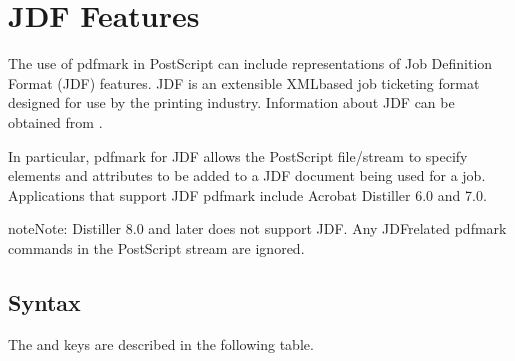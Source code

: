 \documentclass[letterpaper,12pt,english,openany,oneside]{sphinxmanual}
\begin{document}
\chapter{JDF Features}
\label{\detokenize{pdfmark_JDF:jdf-features}}\label{\detokenize{pdfmark_JDF::doc}}
The use of pdfmark in PostScript can include representations of Job Definition Format (JDF) features. JDF is an extensible XML\sphinxhyphen{}based job ticketing format designed for use by the printing industry. Information about JDF can be obtained from  .

In particular, pdfmark for JDF allows the PostScript file/stream to specify elements and attributes to be added to a JDF document being used for a job. Applications that support JDF pdfmark include Acrobat Distiller 6.0 and 7.0.

\begin{sphinxadmonition}{note}{Note:}
Distiller 8.0 and later does not support JDF. Any JDF\sphinxhyphen{}related pdfmark commands in the PostScript stream are ignored.
\end{sphinxadmonition}


\section{Syntax}
\label{\detokenize{pdfmark_JDF:syntax}}
\begin{sphinxVerbatim}[commandchars=\\\{\}]
 \PYG{p}{[} 
         
         
\end{sphinxVerbatim}

The  and  keys are described in the following table.

\end{document}
